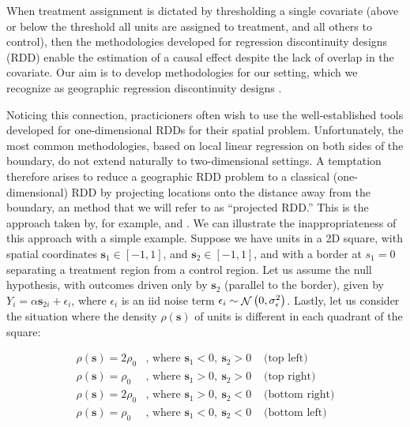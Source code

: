 \documentclass[letter]{article}
\DeclareMathOperator{\normal}{\mathcal{N}}
\newcommand{\sigman}{\sigma_{\epsilon}}
\newcommand{\svec}{\mathbold{s}}
\renewcommand{\cite}[1]{\citep{#1}}
\begin{document}
When treatment assignment is dictated by thresholding a single covariate (above or below the threshold all units are assigned to treatment, and all others to control), then the methodologies developed for regression discontinuity designs (RDD) enable the estimation of a causal effect despite the lack of overlap in the covariate. Our aim is to develop methodologies for our setting, which we recognize as geographic regression discontinuity designs \cite{keele_titiunik_2015}.

Noticing this connection, practicioners often wish to use the well-established tools developed for one-dimensional RDDs for their spatial problem.
Unfortunately, the most common methodologies, based on local linear regression on both sides of the boundary, do not extend naturally to two-dimensional settings.
A temptation therefore arises to reduce a geographic RDD problem to a classical (one-dimensional) RDD by projecting locations onto the distance away from the boundary, an method that we will refer to as ``projected RDD.''
This is the approach taken by, for example, \cite{macdonald2015effect} and \cite{chen2013evidence}. We can illustrate the inappropriateness of this approach with a simple example.
Suppose we have units in a 2D square, with spatial coordinates \(\svec_1 \in [-1,1]\), and \(\svec_2 \in [-1,1]\), and with a border at \(s_1=0\) separating a treatment region from a control region.
Let us assume the null hypothesis, with outcomes driven only by \(\svec_2\) (parallel to the border), given by \(Y_{i} = \alpha \svec_{2i} + \epsilon_i\),
where \(\epsilon_i\) is an iid noise term \(\epsilon_i \sim \normal\del{0, \sigman^2}\).
Lastly, let us consider the situation where the density \(\rho(\svec)\) of units is different in each quadrant of the square:

\begin{equation}
\begin{aligned}
    \rho(\svec) = 2\rho_0 & \text{, where }\svec_1 < 0,~\svec_2 > 0 & \text{ (top left)} \\
    \rho(\svec) = \rho_0 & \text{, where }\svec_1 > 0,~\svec_2 > 0 & \text{ (top right)} \\
    \rho(\svec) = 2\rho_0 & \text{, where }\svec_1 > 0,~\svec_2 < 0 & \text{ (bottom right)}  \\
    \rho(\svec) = \rho_0 & \text{, where }\svec_1 < 0,~\svec_2 < 0 & \text{ (bottom left)}
\end{aligned}
\end{equation}
\end{document}
